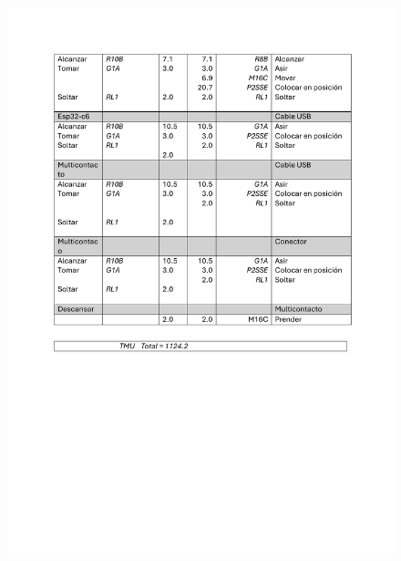     \begin{figure}[H]
        \centering
        \includegraphics[trim = {40mm 60mm 20mm 21mm},clip,scale=0.35]{9/Img/tablaMtmTres.pdf}
        \label{fig:MtmTres}
    \end{figure}
